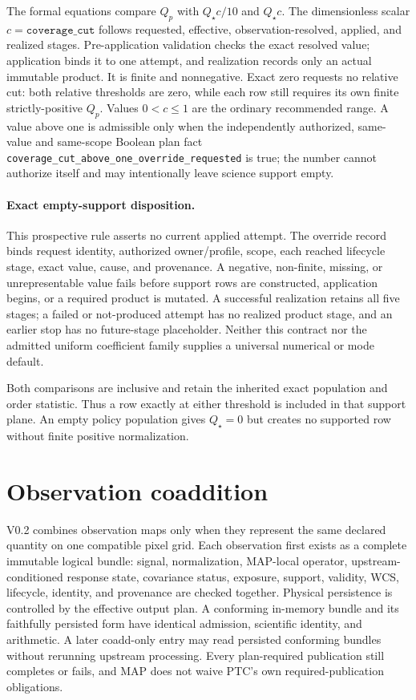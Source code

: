 \documentclass[10pt]{article}
\newcommand{\code}[1]{\nolinkurl{#1}}
\begin{document}
The formal equations compare \(Q_p\) with \(Q_\star c/10\) and \(Q_\star c\).
The dimensionless scalar \(c=\texttt{coverage\_cut}\) follows requested,
effective, observation-resolved, applied, and realized stages. Pre-application
validation checks the exact resolved value; application binds it to one
attempt, and realization records only an actual immutable product. It is finite
and nonnegative. Exact zero requests no relative cut: both relative thresholds are
zero, while each row still requires its own finite strictly-positive \(Q_p\).
Values \(0<c\le1\) are the ordinary recommended range. A value above one is
admissible only when the independently authorized, same-value and same-scope
Boolean plan fact \code{coverage_cut_above_one_override_requested} is true; the
number cannot authorize itself and may intentionally leave science support
empty.

\paragraph{Exact empty-support disposition.}
\SCIMapEmptySupportDispositionBody{}
This prospective rule asserts no current applied attempt. The override record
binds request identity, authorized owner/profile, scope,
each reached lifecycle stage, exact value, cause, and provenance. A negative,
non-finite, missing, or unrepresentable value fails before support rows are
constructed, application begins, or a required product is mutated. A successful
realization retains all five stages; a failed or not-produced attempt has no
realized product stage, and an earlier stop has no future-stage
placeholder. Neither this contract nor the admitted uniform
coefficient family supplies a universal numerical or mode default.

Both comparisons are inclusive and retain the inherited exact population and
order statistic. Thus a row exactly at either threshold is included in that
support plane. An empty policy population gives \(Q_\star=0\) but creates no
supported row without finite positive normalization.

\clearpage
\section{Observation coaddition}\label{sec:coadd}
V0.2 combines observation maps only when they represent the same declared
quantity on one compatible pixel grid. Each observation first exists as a
complete immutable logical bundle: signal, normalization, MAP-local operator,
upstream-conditioned response state, covariance status, exposure, support,
validity, WCS, lifecycle, identity, and provenance are checked together.
Physical persistence is controlled by the effective output plan. A conforming
in-memory bundle and its faithfully persisted form have identical admission,
scientific identity, and arithmetic. A later coadd-only entry may read
persisted conforming bundles without rerunning upstream processing. Every
plan-required publication still completes or fails, and MAP does not waive
PTC's own required-publication obligations.
\end{document}

